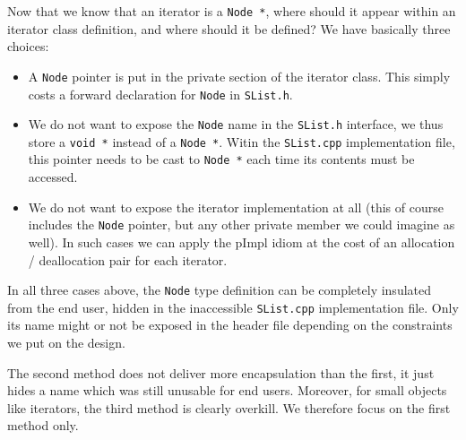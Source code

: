 Now that we know that an iterator is a \lstinline!Node *!, where should it appear within an iterator class definition, and where should it be defined? We have basically three choices:
\begin{itemize}
\item A \lstinline!Node! pointer is put in the private section of the iterator class. This simply costs a forward declaration for \lstinline!Node! in \lstinline!SList.h!.
\item We do not want to expose the \lstinline!Node! name in the \lstinline!SList.h! interface, we thus store a \lstinline!void *! instead of a \lstinline!Node *!. Witin the \lstinline!SList.cpp! implementation file, this pointer needs to be cast to \lstinline!Node *! each time its contents must be accessed.
\item We do not want to expose the iterator implementation at all (this of course includes the \lstinline!Node! pointer, but any other private member we could imagine as well). In such cases we can apply the pImpl idiom at the cost of an allocation / deallocation pair for each iterator.
\end{itemize}
In all three cases above, the \lstinline!Node! type definition can be completely insulated from the end user, hidden in the inaccessible \lstinline!SList.cpp! implementation file. Only its name might or not be exposed in the header file depending on the constraints we put on the design.

The second method does not deliver more encapsulation than the first, it just hides a name which was still unusable for end users. Moreover, for small objects like iterators, the third method is clearly overkill. We therefore focus on the first method only.

